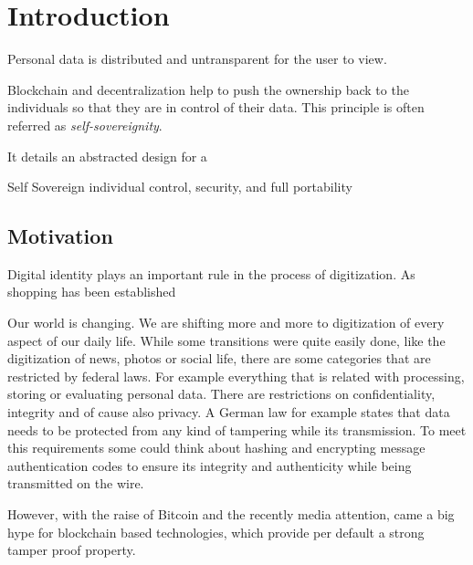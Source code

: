 \chapter{Introduction}
\label{cha:introduction}



Personal data is distributed and untransparent for the user to view.\cite[p. 1]{uPortWhitePaper}

Blockchain and decentralization help to push the ownership back to the individuals so that they are in control of their
data. This principle is often referred as \textit{self-sovereignity}.\cite[p. 1]{uPortWhitePaper}

It details an abstracted design for a

Self Sovereign individual control, security, and full portability

\section{Motivation}
Digital identity plays an important rule in the process of digitization. As shopping has been established

Our world is changing. We are shifting more and more to digitization of every aspect of our daily life.
While some transitions were quite easily done, like the digitization of news, photos or social life,
there are some categories that are restricted by federal laws. For example everything that is related with processing,
storing or evaluating personal data. There are restrictions on confidentiality, integrity and of cause also privacy.
A German law for example states that data needs to be protected from any kind of tampering while its transmission.
To meet this requirements some could think about hashing and encrypting message authentication codes to ensure its
integrity and authenticity while being transmitted on the wire.

However, with the raise of Bitcoin and the recently media attention, came a big hype for blockchain based technologies,
which provide per default a strong tamper proof property.
